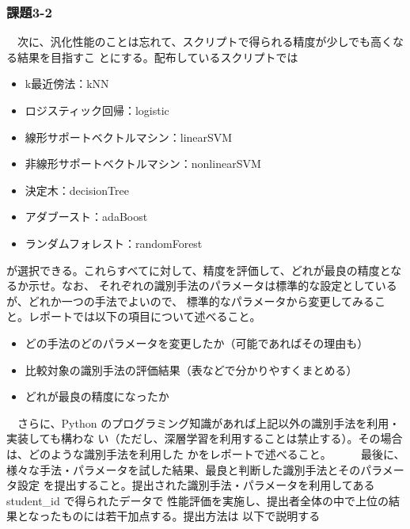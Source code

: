 \subsubsection{課題3-2}
　次に、汎化性能のことは忘れて、スクリプトで得られる精度が少しでも高くなる結果を目指すこ
とにする。配布しているスクリプトでは
\begin{itemize}
  \item k最近傍法：kNN
  \item ロジスティック回帰：logistic
  \item 線形サポートベクトルマシン：linearSVM
  \item 非線形サポートベクトルマシン：nonlinearSVM
  \item 決定木：decisionTree
  \item アダブースト：adaBoost
  \item ランダムフォレスト：randomForest
\end{itemize}
が選択できる。これらすべてに対して、精度を評価して、どれが最良の精度となるか示せ。なお、
それぞれの識別手法のパラメータは標準的な設定としているが、どれか一つの手法でよいので、
標準的なパラメータから変更してみること。レポートでは以下の項目について述べること。
\begin{itemize}
  \item どの手法のどのパラメータを変更したか（可能であればその理由も）
  \item 比較対象の識別手法の評価結果（表などで分かりやすくまとめる）
  \item どれが最良の精度になったか
\end{itemize}
　さらに、Python のプログラミング知識があれば上記以外の識別手法を利用・実装しても構わな
い（ただし、深層学習を利用することは禁止する）。その場合は、どのような識別手法を利用した
かをレポートで述べること。
　
　最後に、様々な手法・パラメータを試した結果、最良と判断した識別手法とそのパラメータ設定
を提出すること。提出された識別手法・パラメータを利用してある student\_id で得られたデータで
性能評価を実施し、提出者全体の中で上位の結果となったものには若干加点する。提出方法は
以下で説明する
